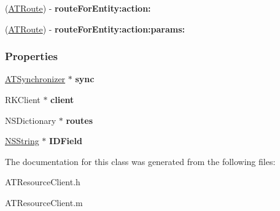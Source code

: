 \begin{DoxyCompactItemize}
\item 
\hypertarget{interface_a_t_resource_client_a53ce9d8ae5a79f9a2f69cc861744109a}{
(\hyperlink{struct___a_t_route}{ATRoute}) -\/ {\bfseries routeForEntity:action:}}
\label{interface_a_t_resource_client_a53ce9d8ae5a79f9a2f69cc861744109a}

\item 
\hypertarget{interface_a_t_resource_client_aca4c252b5fc7af7ea5a41044665b6332}{
(\hyperlink{struct___a_t_route}{ATRoute}) -\/ {\bfseries routeForEntity:action:params:}}
\label{interface_a_t_resource_client_aca4c252b5fc7af7ea5a41044665b6332}

\end{DoxyCompactItemize}
\subsubsection*{Properties}
\begin{DoxyCompactItemize}
\item 
\hypertarget{interface_a_t_resource_client_a799228e0a82deb990c3fc58d69a212b3}{
\hyperlink{interface_a_t_synchronizer}{ATSynchronizer} $\ast$ {\bfseries sync}}
\label{interface_a_t_resource_client_a799228e0a82deb990c3fc58d69a212b3}

\item 
\hypertarget{interface_a_t_resource_client_afa980946f714b777325182bfa38da016}{
RKClient $\ast$ {\bfseries client}}
\label{interface_a_t_resource_client_afa980946f714b777325182bfa38da016}

\item 
\hypertarget{interface_a_t_resource_client_a12baa61aa58e54ccb95025ade33712d3}{
NSDictionary $\ast$ {\bfseries routes}}
\label{interface_a_t_resource_client_a12baa61aa58e54ccb95025ade33712d3}

\item 
\hypertarget{interface_a_t_resource_client_a47f4ef4c9464b546ba7b39eb212f2919}{
\hyperlink{class_n_s_string}{NSString} $\ast$ {\bfseries IDField}}
\label{interface_a_t_resource_client_a47f4ef4c9464b546ba7b39eb212f2919}

\end{DoxyCompactItemize}


The documentation for this class was generated from the following files:\begin{DoxyCompactItemize}
\item 
ATResourceClient.h\item 
ATResourceClient.m\end{DoxyCompactItemize}
